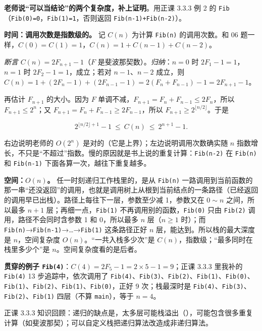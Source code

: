 \documentclass[10.5pt,a4paper,oneside]{article}
\newcommand{\uln}[1]{\CJKunderline[format=\color{wdred},thickness=0.9pt,depth=0.28em]{#1}}
\begin{document}
\begin{addbox}

\textbf{老师说“可以当结论”的两个复杂度，补上证明}。用正课 3.3.3 例 2 的
\texttt{Fib}（\texttt{Fib(0)=0}，\texttt{Fib(1)=1}，否则返回
\texttt{Fib(n-1)+Fib(n-2)}）。

\textbf{时间：调用次数是指数级的。} 记 \(C(n)\) 为计算 \texttt{Fib(n)}
的调用次数。和 06 题一样，\(C(0)=C(1)=1\)，\(C(n)=1+C(n-1)+C(n-2)\)。

\emph{断言} \(C(n)=2F_{n+1}-1\)（\(F\)
是斐波那契数）。\emph{归纳}：\(n=0\) 时 \(2F_1-1=1\)，\(n=1\) 时
\(2F_2-1=1\)，成立；若对 \(n-1\)、\(n-2\) 成立，则
\(C(n)=1+(2F_n-1)+(2F_{n-1}-1)=2(F_n+F_{n-1})-1=2F_{n+1}-1\)。

再估计 \(F_{n+1}\) 的大小。因为 \(F\)
单调不减，\(F_{n+1}=F_n+F_{n-1}\le2F_n\)，所以 \(F_{n+1}\le2^n\)；又
\(F_{n+1}=F_n+F_{n-1}\ge2F_{n-1}\)，所以
\(F_{n+1}\ge2^{\lfloor n/2\rfloor}\)。于是

\[2^{\lfloor n/2\rfloor+1}-1\ \le\ C(n)\ \le\ 2^{n+1}-1 .\]

右边说明老师的 \(O(2^n)\) 是对的（它是上界）；左边说明调用次数确实随
\(n\)
指数增长，不只是“不超过”指数。慢的原因就是书上说的重复计算：\texttt{Fib(n-2)}
在 \texttt{Fib(n)} 和 \texttt{Fib(n-1)} 下面各算一次，越往下重复越多。

\textbf{空间：\(O(n)\)。} 任一时刻递归工作栈里的，是从 \texttt{Fib(n)}
一路调用到当前函数的那一串“还没返回”的调用，也就是调用树上从根到当前结点的一条路径（已经返回的调用早已出栈）。路径上每往下一层，参数至少减
1，参数又在 \(0\sim n\) 之间，所以最多 \(n+1\)
层；再细一点，\texttt{Fib(1)} 不再调用别的函数，\texttt{Fib(0)} 只由
\texttt{Fib(2)} 调用，路径不会同时含参数 1 和 0，所以最多 \(n\)
层（\(n\ge1\) 时）；而
\texttt{Fib(n)}→\texttt{Fib(n-1)}→\ldots→\texttt{Fib(1)} 这条路径正好
\(n\) 层，能达到。所以栈的最大深度是 \(n\)，空间复杂度
\(O(n)\)。“一共入栈多少次”是 \(C(n)\)，指数级；“最多同时在栈里多少个”是
\(n\)。空间复杂度看的是后者。

\textbf{贯穿的例子 \texttt{Fib(4)}}：\(C(4)=2F_5-1=2\times5-1=9\)；正课
3.3.3 里我补的 \texttt{Fib(4)} 13 步追踪中，依次调用了
\texttt{Fib(4)}、\texttt{Fib(3)}、\texttt{Fib(2)}、\texttt{Fib(1)}、\texttt{Fib(0)}、\texttt{Fib(1)}、\texttt{Fib(2)}、\texttt{Fib(1)}、\texttt{Fib(0)}，正好
9 次；栈最深时是
\texttt{Fib(4)}、\texttt{Fib(3)}、\texttt{Fib(2)}、\texttt{Fib(1)}
四层（不算 \texttt{main}），等于 \(n=4\)。

\end{addbox}

\begin{recallbox}

正课 3.3.3
知识回顾：递归的缺点是\uln{效率低}，太多层可能栈溢出（\uln{空间复杂度＝递归深度}），可能包含很多重复计算（如斐波那契）；可以自定义栈把递归算法改造成非递归算法。

\end{recallbox}
\end{document}
